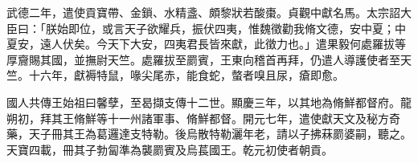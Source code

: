 \begin{pinyinscope}
 武德二年，遣使貢寶帶、金鎖、水精盞、頗黎狀若酸棗。貞觀中獻名馬。太宗詔大臣曰：「朕始即位，或言天子欲耀兵，振伏四夷，惟魏徵勸我脩文德，安中夏；中夏安，遠人伏矣。今天下大安，四夷君長皆來獻，此徵力也。」遣果毅何處羅拔等厚齎賜其國，並撫尉天竺。處羅拔至罽賓，王東向稽首再拜，仍遣人導護使者至天竺。十六年，獻褥特鼠，喙尖尾赤，能食蛇，螫者嗅且尿，瘡即愈。



 國人共傳王始祖曰馨孽，至曷擷支傳十二世。顯慶三年，以其地為脩鮮都督府。龍朔初，拜其王脩鮮等十一州諸軍事、脩鮮都督。開元七年，遣使獻天文及秘方奇藥，天子冊其王為葛邏達支特勒。後烏散特勒灑年老，請以子拂菻罽婆嗣，聽之。天寶四載，冊其子勃匐準為襲罽賓及烏萇國王。乾元初使者朝貢。



\end{pinyinscope}